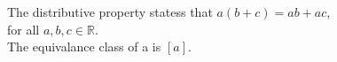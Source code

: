 \documentclass[11 pt]{article}
\begin{document}
The distributive property statess that $a(b+c)=ab+ac$,\\for
all $a,b,c\in\mathbb{R}$. \\[6pt]
The equivalance class of a is $[a]$.
\end{document}
